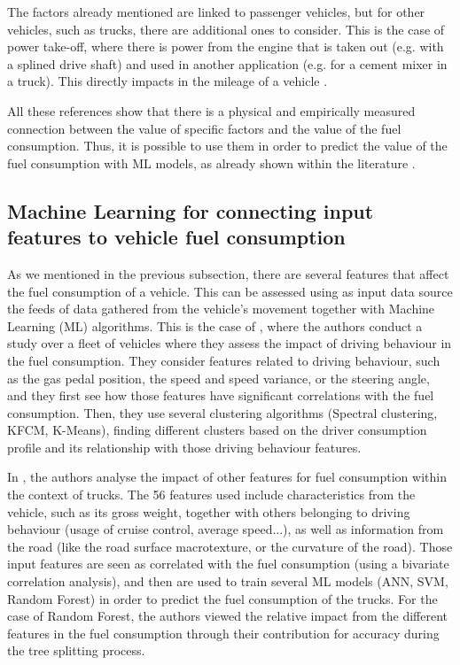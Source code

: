 The factors already mentioned are linked to passenger vehicles, but for other vehicles, such as trucks, there are additional ones to consider. This is the case of power take-off, where there is power from the engine that is taken out (e.g. with a splined drive shaft) and used in another application (e.g. for a cement mixer in a truck). This directly impacts in the mileage of a vehicle \parencite{boriboonsomsin2010analysis}.

All these references show that there is a physical and empirically measured connection between the value of specific factors and the value of the fuel consumption. Thus, it is possible to use them in order to predict the value of the fuel consumption with ML models, as already shown within the literature \parencite{9072728, 8727915, perrotta2017application}.

\subsection{Machine Learning for connecting input features to vehicle fuel consumption}\label{subsec:ch2-sota-ml-fuel-consumption}
As we mentioned in the previous subsection, there are several features that affect the fuel consumption of a vehicle. This can be assessed using as input data source the feeds of data gathered from the vehicle's movement together with Machine Learning (ML) algorithms. This is the case of \parencite{ping2019impact}, where the authors conduct a study over a fleet of vehicles where they assess the impact of driving behaviour in the fuel consumption. They consider features related to driving behaviour, such as the gas pedal position, the speed and speed variance, or the steering angle, and they first see how those features have significant correlations with the fuel consumption. Then, they use several clustering algorithms (Spectral clustering, KFCM, K-Means), finding different clusters based on the driver consumption profile and its relationship with those driving behaviour features. 

In \parencite{perrotta2017application}, the authors analyse the impact of other features for fuel consumption within the context of trucks. The 56 features used include characteristics from the vehicle, such as its gross weight, together with others belonging to driving behaviour (usage of cruise control, average speed...), as well as information from the road (like the road surface macrotexture, or the curvature of the road). Those input features are seen as correlated with the fuel consumption (using a bivariate correlation analysis), and then are used to train several ML models (ANN, SVM, Random Forest) in order to predict the fuel consumption of the trucks. For the case of Random Forest, the authors viewed the relative impact from the different features in the fuel consumption through their contribution for accuracy during the tree splitting process.

